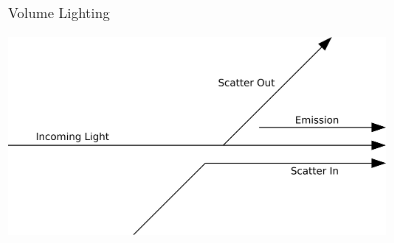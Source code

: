 \documentclass[10pt,compress,professionalfont]{beamer}
\begin{document}
\begin{frame}{Volume Lighting}

    \centering
    \vspace{0cm}
    \includegraphics[width=100mm]{../img/diag/vol_scatter.pdf}

\end{frame}
\end{document}
